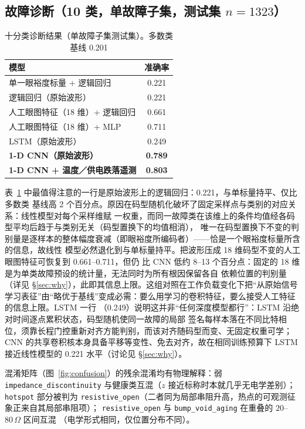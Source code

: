 \documentclass[11pt,a4paper,fontset=mac]{ctexart}
\begin{document}
\subsection{故障诊断（10 类，单故障子集，测试集 $n=1323$）}
\begin{table}[h]\centering\small
\caption{十分类诊断结果（单故障子集测试集）。多数类基线 0.201}\label{tab:diag}
\begin{tabular}{@{}lc@{}}
\toprule
模型 & 准确率 \\
\midrule
单一眼裕度标量 + 逻辑回归 & 0.221 \\
逻辑回归（原始波形） & 0.221 \\
人工眼图特征（18 维）+ 逻辑回归 & 0.661 \\
人工眼图特征（18 维）+ MLP & 0.711 \\
LSTM（原始波形） & 0.249 \\
\textbf{1-D CNN（原始波形）} & \textbf{0.789} \\
\textbf{1-D CNN + 温度／供电跌落遥测} & \textbf{0.803} \\
\bottomrule
\end{tabular}
\end{table}

表~\ref{tab:diag} 中最值得注意的一行是原始波形上的逻辑回归：0.221，与单标量持平、仅比多数类
基线高 2 个百分点。原因在码型随机化破坏了固定采样点与类别的对应关系：线性模型对每个采样维赋
一权重，而同一故障类在该维上的条件均值经各码型平均后趋于与类别无关（码型置换下的均值相消），
唯一在码型置换下不变的判别量是逐样本的整体幅度衰减（即眼裕度所编码者）——恰是一个眼裕度标量所含的信息，故线性
模型必然退化到与单标量持平。把波形压成 18 维码型不变的人工眼图特征可恢复到 0.661--0.711，但仍
比 CNN 低约 8--13 个百分点：固定的 18 维是为单类故障预设的统计量，无法同时为所有根因保留各自
依赖位置的判别量（详见 \S\ref{sec:why}），此即其信息上限。这组对照在工作负载变化下把“从原始信号
学习表征”由“略优于基线”变成必需：要么用学习的卷积特征，要么接受人工特征的信息上限。LSTM 一行
（0.249）说明这并非“任何深度模型都行”：LSTM 沿绝对时间逐点累积状态，码型随机使同一故障的局部
签名每样本落在不同比特相位，须靠长程门控重新对齐方能判别，而该对齐随码型而变、无固定权重可学；
CNN 的共享卷积核本身具备平移等变性、免去对齐，故在相同训练预算下 LSTM 接近线性模型的 0.221
水平（讨论见 \S\ref{sec:why}）。

混淆矩阵（图~\ref{fig:confusion}）的残余混淆均有物理解释：弱 \texttt{impedance\_discontinuity}
与健康类互混（$z$ 接近标称时本就几乎无电学差别）；\texttt{hotspot} 部分被判为
\texttt{resistive\_open}（二者同为局部串阻升高，热点的可观测征象正来自其局部串阻项）；
\texttt{resistive\_open} 与 \texttt{bump\_void\_aging} 在重叠的 $20$--$80\,\Omega$ 区间互混
（电学形式相同，仅位置分布不同）。
\end{document}

